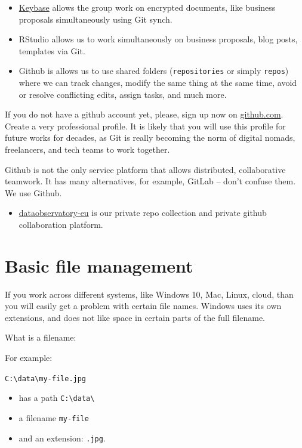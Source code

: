 \documentclass[
  a4paper,
  openany, a4paper, oneside]{book}
\providecommand{\tightlist}{%
  \setlength{\itemsep}{0pt}\setlength{\parskip}{0pt}}
\begin{document}
\begin{itemize}
\item
  \protect\hyperlink{keybase}{Keybase} allows the group work on encrypted documents, like business proposals simultaneously using Git synch.
\item
  RStudio allows us to work simultaneously on business proposals, blog posts, templates via Git.
\item
  Github is allows us to use shared folders (\texttt{repositories} or simply \texttt{repos}) where we can track changes, modify the same thing at the same time, avoid or resolve conflicting edits, assign tasks, and much more.
\end{itemize}

If you do not have a github account yet, please, sign up now on \href{https://github.com/}{github.com}. Create a very professional profile. It is likely that you will use this profile for future works for decades, as Git is really becoming the norm of digital nomads, freelancers, and tech teams to work together.

Github is not the only service platform that allows distributed, collaborative teamwork. It has many alternatives, for example, GitLab -- don't confuse them. We use Github.

\begin{itemize}
\tightlist
\item
  \href{https://github.com/dataobservatory-eu}{dataobservatory-eu} is our private repo collection and private github collaboration platform.
\end{itemize}

\hypertarget{filemanagement}{%
\section{Basic file management}\label{filemanagement}}

If you work across different systems, like Windows 10, Mac, Linux, cloud, than you will easily get a problem with certain file names. Windows uses its own extensions, and does not like space in certain parts of the full filename.

What is a filename:

For example:

\texttt{C:\textbackslash{}data\textbackslash{}my-file.jpg}

\begin{itemize}
\tightlist
\item
  has a path \texttt{C:\textbackslash{}data\textbackslash{}}
\item
  a filename \texttt{my-file}
\item
  and an extension: \texttt{.jpg}.
\end{itemize}
\end{document}
